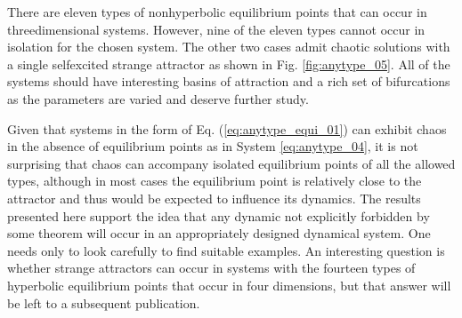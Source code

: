 There are eleven types of nonhyperbolic equilibrium points that can occur in threedimensional
systems. However, nine of the eleven types cannot occur in isolation for
the chosen system. The other two cases admit chaotic solutions with a single selfexcited
strange attractor as shown in Fig. \ref{fig:anytype_05}. All of the systems should have interesting
basins of attraction \cite{16Chaudhuri2014Complicated} and a rich set of bifurcations as the parameters are varied
and deserve further study.

Given that systems in the form of Eq. (\ref{eq:anytype_equi_01}) can exhibit chaos in the absence of
equilibrium points as in System \ref{eq:anytype_04}, it is not surprising that chaos can accompany
isolated equilibrium points of all the allowed types, although in most cases the equilibrium
point is relatively close to the attractor and thus would be expected to influence
its dynamics. The results presented here support the idea that any dynamic not explicitly
forbidden by some theorem will occur in an appropriately designed dynamical
system. One needs only to look carefully to find suitable examples. An interesting
question is whether strange attractors can occur in systems with the fourteen types
of hyperbolic equilibrium points that occur in four dimensions, but that answer will
be left to a subsequent publication.




